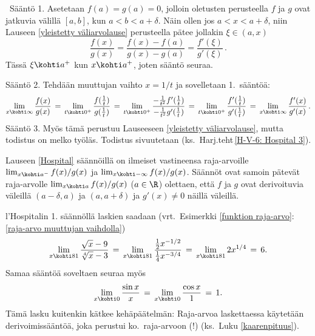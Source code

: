 \tod \ Sääntö 1. Asetetaan $f(a)=g(a)=0$, jolloin oletusten perusteella $f$ ja $g$ ovat
jatkuvia välillä $[a,b]$, kun $a<b<a+\delta$. Näin ollen jos $a<x<a+\delta$, niin
Lauseen \ref{yleistetty väliarvolause} perusteella pätee jollakin $\xi\in(a,x)$
\[
\frac{f(x)}{g(x)} = \frac{f(x)-f(a)}{g(x)-g(a)} = \frac{f'(\xi)}{g'(\xi)}\,.
\]
Tässä $\xi \kohti a^+$ kun $x \kohti a^+$, joten sääntö seuraa.

Sääntö 2. Tehdään muuttujan vaihto $x=1/t$ ja sovelletaan 1.\ sääntöä:
\[
\lim_{x\kohti\infty}\frac{f(x)}{g(x)} 
   \,=\, \lim_{t \kohti 0^+} \frac{f(\tfrac{1}{t})}{g(\tfrac{1}{t})}
   \,=\, \lim_{t \kohti 0^+} \frac{-\tfrac{1}{t^2}f'(\tfrac{1}{t})}
                                 {-\tfrac{1}{t^2}g'(\tfrac{1}{t})}
   \,=\, \lim_{t \kohti 0^+} \frac{f'(\tfrac{1}{t})}{g'(\tfrac{1}{t})}
   \,=\, \lim_{x\kohti\infty} \frac{f'(x)}{g'(x)}\,.
\]
Sääntö 3. Myös tämä perustuu Lauseeseen \ref{yleistetty väliarvolause}, mutta todistus on
melko työläs. Todistus sivuutetaan (ks.\ Harj.teht\,\ref{H-V-6: Hospital 3}). \loppu

Lauseen \ref{Hospital} säännöillä on ilmeiset vastineensa raja-arvoille 
$\lim_{x \kohti a^-}f(x)/g(x)$ ja $\lim_{x \kohti -\infty}f(x)/g(x)$. Säännöt ovat samoin pätevät
raja-arvolle $\lim_{x \kohti a}f(x)/g(x)$ ($a\in\R$) olettaen, että $f$ ja $g$ ovat 
derivoituvia väleillä $(a-\delta,a)$ ja $(a,a+\delta)$ ja $g'(x) \neq 0$ näillä väleillä.
\begin{Exa} l'Hospitalin 1. säännöllä laskien saadaan 
(vrt.\ Esimerkki \ref{funktion raja-arvo}:\ref{raja-arvo muuttujan vaihdolla})
\[
\lim_{x \kohti 81} \frac{\sqrt{x}-9}{\sqrt[4]{x}-3} 
  \,=\, \lim_{x \kohti 81} \frac{\tfrac{1}{2}x^{-1/2}}{\tfrac{1}{4}x^{-3/4}}
  \,=\, \lim_{x \kohti 81} 2x^{1/4} \,=\, 6.
\] 
Samaa sääntöä soveltaen seuraa myös
\[
\lim_{x \kohti 0} \frac{\sin x}{x} \,=\, \lim_{x \kohti 0}\frac{\cos x}{1} \,=\, 1.
\]
Tämä lasku kuitenkin kätkee kehäpäätelmän: Raja-arvoa laskettaessa käytetään
derivoimissääntöä, joka perustui ko.\ raja-arvoon (!) (ks.\ Luku \ref{kaarenpituus}). \loppu
\end{Exa}


